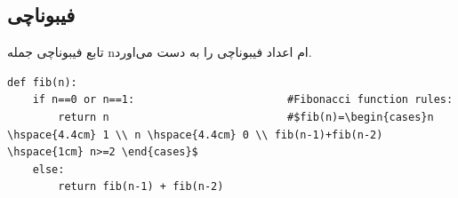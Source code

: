 \documentclass[a4paper]{article}
\begin{document}
\subsection{فیبوناچی}
\label{sec:orgfb4f6e1}
تابع فیبوناچی جمله nام اعداد فیبوناچی را به دست می‌اورد.

\begin{verbatim}
def fib(n):
    if n==0 or n==1:                        #Fibonacci function rules:
        return n                            #$fib(n)=\begin{cases}n \hspace{4.4cm} 1 \\ n \hspace{4.4cm} 0 \\ fib(n-1)+fib(n-2) \hspace{1cm} n>=2 \end{cases}$
    else:
        return fib(n-1) + fib(n-2)
\end{verbatim}
\end{document}

